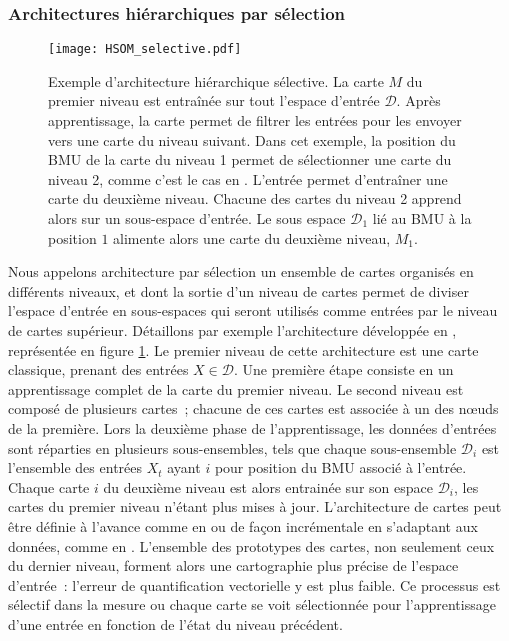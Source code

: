 \documentclass[../main]{subfiles}
\begin{document}
\subsubsection{Architectures hiérarchiques par sélection}

\begin{figure}
    \texttt{[image: HSOM\_selective.pdf]}
    \caption{Exemple d'architecture hiérarchique sélective. La carte $M$ du premier niveau est entraînée sur tout l'espace d'entrée $\mathcal{D}$. Après apprentissage, la carte permet de filtrer les entrées pour les envoyer vers une carte du niveau suivant. Dans cet exemple, la position du BMU de la carte du niveau 1 permet de sélectionner une carte du niveau 2, comme c'est le cas en \cite{barbalho_hierarchical_2001}. 
    L'entrée permet d'entraîner une carte du deuxième niveau. Chacune des cartes du niveau 2 apprend alors sur un sous-espace d'entrée. Le sous espace $\mathcal{D}_1$ lié au BMU à la position $1$ alimente alors une carte du deuxième niveau, $M_1$.
    \label{fig:hsom_selective}}
\end{figure}

Nous appelons architecture par sélection un ensemble de cartes organisés en différents niveaux, et dont la sortie d'un niveau de cartes permet de diviser l'espace d'entrée en sous-espaces qui seront utilisés comme entrées par le niveau de cartes supérieur.
Détaillons par exemple l'architecture développée en \cite{barbalho_hierarchical_2001}, représentée en figure \ref{fig:hsom_selective}. 
Le premier niveau de cette architecture est une carte classique, prenant des entrées $X \in \mathcal{D}$.
Une première étape consiste en un apprentissage complet de la carte du premier niveau.
Le second niveau est composé de plusieurs cartes~; chacune de ces cartes est associée à un des n\oe{}uds de la première.
Lors la deuxième phase de l'apprentissage, les données d'entrées sont réparties en plusieurs sous-ensembles, tels que chaque sous-ensemble $\mathcal{D}_i$ est l'ensemble des entrées $X_t$ ayant $i$ pour position du BMU associé à l'entrée.
Chaque carte $i$ du deuxième niveau est alors entrainée sur son espace $\mathcal{D}_i$, les cartes du premier niveau n'étant plus mises à jour.
L'architecture de cartes peut être définie à l'avance comme en \cite{barbalho_hierarchical_2001} ou de façon incrémentale en s'adaptant aux données, comme en \cite{Costa2016ANS}.
L'ensemble des prototypes des cartes, non seulement ceux du dernier niveau, forment alors une cartographie plus précise de l'espace d'entrée~: l'erreur de quantification vectorielle y est plus faible.
Ce processus est sélectif dans la mesure ou chaque carte se voit sélectionnée pour l'apprentissage d'une entrée en fonction de l'état du niveau précédent.
\end{document}
